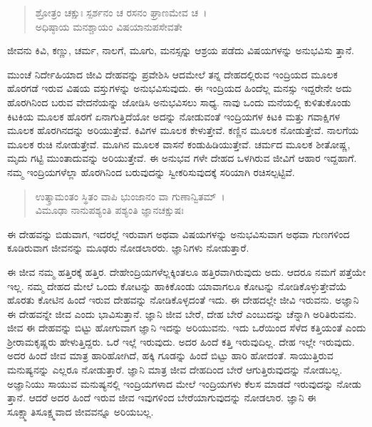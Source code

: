 \begin{verse}
ಶ್ರೋತ್ರಂ ಚಕ್ಷುಃ ಸ್ಪರ್ಶನಂ ಚ ರಸನಂ ಘ್ರಾಣಮೇವ ಚ~।\\ಅಧಿಷ್ಠಾಯ ಮನಶ್ಚಾಯಂ ವಿಷಯಾನುಪಸೇವತೇ 
\end{verse}

{\small ಜೀವನು ಕಿವಿ, ಕಣ್ಣು, ಚರ್ಮ, ನಾಲಗೆ, ಮೂಗು, ಮನಸ್ಸನ್ನು ಆಶ್ರಯ ಪಡೆದು ವಿಷಯಗಳನ್ನು ಅನುಭವಿಸು ತ್ತಾನೆ.}

ಮುಂಚೆ ನಿರ್ದೇಹಿಯಾದ ಜೀವಿ ದೇಹವನ್ನು ಪ್ರವೇಶಿಸಿ ಆದಮೇಲೆ ತನ್ನ ದೇಹದಲ್ಲಿರುವ ಇಂದ್ರಿಯದ ಮೂಲಕ ಹೊರಗಡೆ ಇರುವ ವಿಷಯ ವಸ್ತುಗಳನ್ನು ಅನುಭವಿಸುವುದು. ಈ ಇಂದ್ರಿಯದ ಹಿಂದೆಲ್ಲ ಮನಸ್ಸು ಇದ್ದರೇನೇ ಅದು ಹೊರಗಿನಿಂದ ಬರುವ ವೇದನೆಯನ್ನು ಜೋಡಿಸಿ ಅನುಭವಿಸಲು ಸಾಧ್ಯ. ನಾವು ಒಂದು ಮನೆಯಲ್ಲಿ ಕುಳಿತುಕೊಂಡು ಕಿಟಕಿಯ ಮೂಲಕ ಹೊರಗೆ ಏನಾಗುತ್ತಿದೆಯೋ ಅದನ್ನು ನೋಡುವಂತೆ ಇಂದ್ರಿಯಗಳ ಕಿಟಕಿ ಮತ್ತು ಗವಾಕ್ಷಿಗಳ ಮೂಲಕ ಹೊರಗಿನದನ್ನು ಅರಿಯುತ್ತೇವೆ. ಕಿವಿಗಳ ಮೂಲಕ ಕೇಳುತ್ತೇವೆ. ಕಣ್ಣಿನ ಮೂಲಕ ನೋಡುತ್ತೇವೆ. ನಾಲಗೆಯ ಮೂಲಕ ರುಚಿ ನೋಡುತ್ತೇವೆ. ಮೂಗಿನ ಮೂಲಕ ವಾಸನೆ ಕಂಡುಹಿಡಿಯುತ್ತೇವೆ. ಚರ್ಮದ ಮೂಲಕ ಶೀತೋಷ್ಣ, ಮೃದು ಗಟ್ಟಿ ಮುಂತಾದುವನ್ನು ಅರಿಯುತ್ತೇವೆ. ಈ ಅನುಭವ ಗಳೇ ದೇಹದ ಒಳಗಿರುವ ಜೀವಿಗೆ ಆಹಾರ ಇದ್ದಹಾಗೆ. ನಮ್ಮ ಇಂದ್ರಿಯಗಳೆಲ್ಲಾ ಹೊರಗಿನಿಂದ ಬರುವುದನ್ನು ಸ್ವೀಕರಿಸುವುದಕ್ಕೆ ಸರಿಯಾಗಿ ರಚಿಸಲ್ಪಟ್ಟಿವೆ.

\begin{verse}
ಉತ್ಕ್ರಾಮಂತಂ ಸ್ಥಿತಂ ವಾಪಿ ಭುಂಜಾನಂ ವಾ ಗುಣಾನ್ವಿತಮ್~।\\ವಿಮೂಢಾ ನಾನುಪಶ್ಯಂತಿ ಪಶ್ಯಂತಿ ಜ್ಞಾನಚಕ್ಷುಷಃ 
\end{verse}

{\small ಈ ದೇಹವನ್ನು ಬಿಡುವಾಗ, ಇದರಲ್ಲೆ ಇರುವಾಗ ಅಥವಾ ವಿಷಯಗಳನ್ನು ಅನುಭವಿಸುವಾಗ ಅಥವಾ ಗುಣಗಳಿಂದ ಕೂಡಿರುವಾಗ ಜೀವನನ್ನು ಮೂಢರು ನೋಡಲಾರರು. ಜ್ಞಾನಿಗಳು ನೋಡುತ್ತಾರೆ.}

ಈ ಜೀವ ನಮ್ಮ ಹತ್ತಿರಕ್ಕೆ ಹತ್ತಿರ. ದೇಹೇಂದ್ರಿಯಗಳೆಲ್ಲಕ್ಕಿಂತಲೂ ಹತ್ತಿರವಾಗಿರುವುದು ಅದು. ಆದರೂ ನಮಗೆ ಪತ್ತೆಯೇ ಇಲ್ಲ. ನಮ್ಮ ದೇಹದ ಮೇಲೆ ಒಂದು ಕೋಟನ್ನು ಹಾಕಿಕೊಂಡು ಯಾವಾಗಲೂ ಕೋಟನ್ನು ನೋಡಿಕೊಳ್ಳುತ್ತೇವೆಯೆ ಹೊರತು ಕೋಟಿನ ಹಿಂದೆ ಇರುವ ದೇಹವನ್ನು ನೋಡಿಕೊಳ್ಳದಂತೆ ಇದು. ಈ ದೇಹದಲ್ಲೇ ಜೀವಿ ಇರುವನು. ಅಜ್ಞಾನಿ ಈ ದೇಹವನ್ನೇ ಜೀವ ಎಂದು ಭಾವಿಸುತ್ತಾನೆ. ಜ್ಞಾನಿ ಜೀವ ಬೇರೆ, ದೇಹ ಬೇರೆ ಎಂಬುದನ್ನು ಚೆನ್ನಾಗಿ ಅರಿತಿರುವನು. ಜೀವ ಈ ದೇಹವನ್ನು ಬಿಟ್ಟು ಹೋಗುವಾಗ ಜ್ಞಾನಿ ಇದನ್ನು ಅರಿಯುವನು. ಇದು ಒರೆಯಿಂದ ಸೆಳೆದ ಕತ್ತಿಯಂತೆ ಎಂದು ಶ‍್ರೀರಾಮಕೃಷ್ಣರು ಹೇಳುತ್ತಿದ್ದರು. ಒರೆ ಇಲ್ಲೆ ಇರುವುದು. ಅದರ ಹಿಂದೆ ಕತ್ತಿ ಇರುವುದಿಲ್ಲ. ದೇಹ ಇಲ್ಲೇ ಇರುವುದು. ಅದರ ಹಿಂದೆ ಜೀವ ಮಾತ್ರ ಹಾರಿಹೋಗಿದೆ, ಹಕ್ಕಿ ಗೂಡನ್ನು ಹಿಂದೆ ಬಿಟ್ಟು ಹಾರಿ ಹೋದಂತೆ. ಸಾಯುತ್ತಿರುವ ಮನುಷ್ಯನನ್ನು ಎಲ್ಲರೂ ನೋಡುತ್ತಾರೆ. ಜ್ಞಾನಿ ಮಾತ್ರ ಜೀವ ದೇಹದಿಂದ ಬೇರೆ ಆಗುತ್ತಿರುವುದನ್ನು ನೋಡಬಲ್ಲ. ಅಜ್ಞಾನಿಯು ಸಾಯುವ ಮನುಷ್ಯನಲ್ಲಿ ಇಂದ್ರಿಯಗಳಾದ ಮೇಲೆ ಇಂದ್ರಿಯಗಳು ಕೆಲಸ ಮಾಡದೆ ಇರುವುದನ್ನು ನೋಡು ತ್ತಾನೆ. ಆದರೆ ಅದರ ಹಿಂದೆ ಇರುವ ಜೀವ ಇವುಗಳಿಂದ ಬೇರೆಯಾಗುವುದನ್ನು ನೋಡಲಾರ. ಜ್ಞಾನಿ ಈ ಸೂಕ್ಷ್ಮಾತಿಸೂಕ್ಷ್ಮವಾದ ಜೀವವನ್ನೂ ಅರಿಯಬಲ್ಲ.

